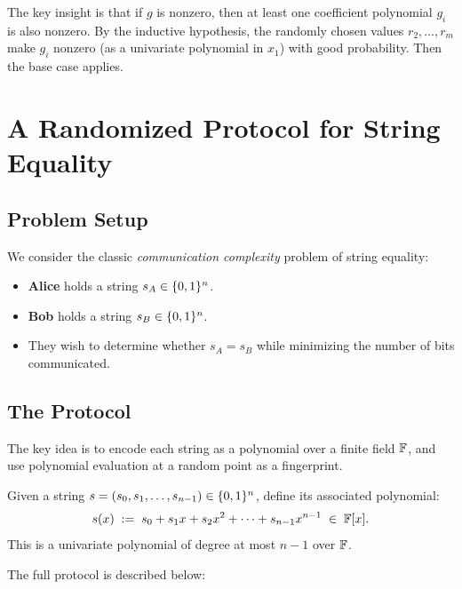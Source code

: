 \documentclass[11pt]{article}
\begin{document}
\begin{remark}
  The key insight is that if $g$ is nonzero, then at least one coefficient
  polynomial $g_i$ is also nonzero. By the inductive hypothesis, the randomly
  chosen values $r_2, \ldots, r_m$ make $g_i$ nonzero (as a univariate
  polynomial in $x_1$) with good probability. Then the base case applies.
\end{remark}

\section{A Randomized Protocol for String Equality}
\label{sec:string-equality}

\subsection{Problem Setup}

We consider the classic \emph{communication complexity} problem of
string equality:
\begin{itemize}
  \item \textbf{Alice} holds a string $s_A \in \{0,1\}^n$.
  \item \textbf{Bob} holds a string $s_B \in \{0,1\}^n$.
  \item They wish to determine whether $s_A = s_B$ while minimizing
        the number of bits communicated.
\end{itemize}

\subsection{The Protocol}

The key idea is to encode each string as a polynomial over a finite field
$\mathbb{F}$, and use polynomial evaluation at a random point as a fingerprint.

\begin{tcolorbox}[colback=blue!5!white, colframe=blue!40!black,
                  title=Polynomial Encoding of a String]
Given a string $s = (s_0, s_1, \ldots, s_{n-1}) \in \{0,1\}^n$, define
its associated polynomial:
\[
  s(x) \;:=\; s_0 + s_1 x + s_2 x^2 + \cdots + s_{n-1} x^{n-1}
         \;\in\; \mathbb{F}[x].
\]
This is a univariate polynomial of degree at most $n-1$ over $\mathbb{F}$.
\end{tcolorbox}

The full protocol is described below:
\end{document}
